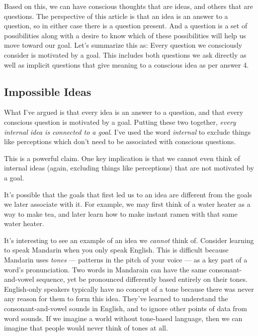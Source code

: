 \documentclass[11pt, oneside]{article}   	%
\newenvironment{answer}[1]
  {\renewcommand\theinnercustomthm{#1}\innercustomthm}
  {\endinnercustomthm}
\begin{document}
Based on this, we can have conscious thoughts that are ideas, and others that
are questions. The perspective of this article is that an idea is an answer to a
question, so in either case there is a question present. And a question is a set
of possibilities along with a desire to know which of these possibilities will
help us move toward our goal.
Let's summarize this as:
\begin{answer}{5}
    Every question we consciously consider is motivated by a goal.
\end{answer}
This includes both questions we ask directly as well as
implicit questions that give meaning to a conscious idea as per
answer 4.

\subsection{Impossible Ideas}

What I've argued is that every idea is an answer to a question, and that every
conscious question is motivated by a goal. Putting these two together,
{\em every
internal idea is connected to a goal}. I've used the word {\em internal}
to exclude things like perceptions which don't need to be associated with
conscious questions.

This is a powerful claim. One key implication is that we cannot even think of
internal ideas (again, excluding things like perceptions)
that are not motivated by
a goal.

It's possible that the goals that first led us to an idea are
different from the goals we later associate with it. For example, we may first
think of a water heater as a way to make tea, and later learn how to make
instant ramen with that same water heater.

It's interesting to see an example of an idea we {\em cannot} think of.
Consider learning to speak Mandarin when you only speak English.
This is difficult because Mandarin uses {\em tones} --- patterns in the pitch of
your voice --- as a key part of a word's pronunciation.
Two words in Mandarain can have
the same consonant-and-vowel sequence, yet be
pronounced differently based entirely on their tones.
English-only speakers typically have no concept of a tone because there was
never any reason for them to form this idea.
They've learned to understand the consonant-and-vowel sounds in English, and to
ignore other points of data from word sounds. If we imagine a world without
tone-based language, then we can imagine that people would never think of
tones at all.
\end{document}
